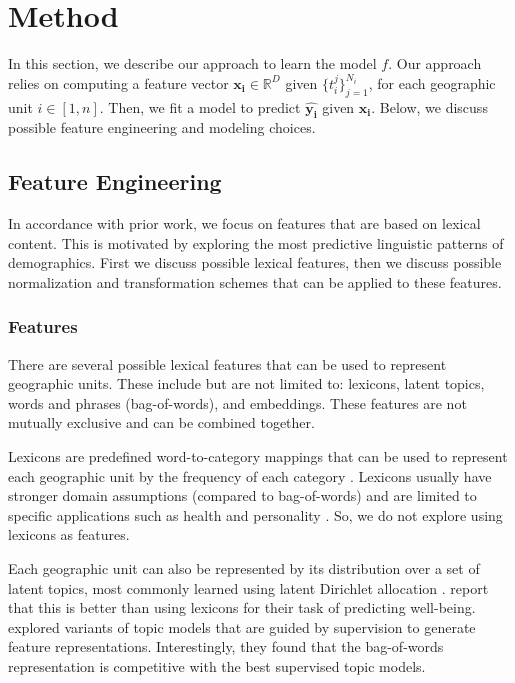 \documentclass[letterpaper]{article}
\begin{document}
\section{Method}

\noindent In this section, we describe our approach to learn the model $f$. Our approach relies on computing a feature vector $\mathbf{x_i} \in \mathbb{R}^D$ given $\{t_i^j\}_{j=1}^{N_i}$, for each geographic unit $i \in [1, n]$. Then, we fit a model to predict $\widehat{\mathbf{y_i}}$ given $\mathbf{x_i}$. Below, we discuss possible feature engineering and modeling choices.

\subsection{Feature Engineering}
In accordance with prior work, we focus on features that are based on lexical content. This is motivated by exploring the most predictive linguistic patterns of demographics. First we discuss possible lexical features, then we discuss possible normalization and transformation schemes that can be applied to these features.

\subsubsection{Features} There are several possible lexical features that can be used to represent geographic units. These include but are not limited to: lexicons, latent topics, words and phrases (bag-of-words), and embeddings. These features are not mutually exclusive and can be combined together.

Lexicons are predefined word-to-category mappings that can be used to represent each geographic unit by the frequency of each category \cite{schwartz2013characterizing,culotta2014estimating}. Lexicons usually have stronger domain assumptions (compared to bag-of-words) \cite{o2011computational} and are limited to specific applications such as health and personality \cite{culotta2014estimating}. So, we do not explore using lexicons as features.

Each geographic unit can also be represented by its distribution over a set of latent topics, most commonly learned using latent Dirichlet allocation \cite{blei2003latent}. \citeauthor{schwartz2013characterizing}  report that this is better than using lexicons for their task of predicting well-being. \citeauthor{benton2016collective}  explored variants of topic models that are guided by supervision to generate feature representations. Interestingly, they found that the bag-of-words representation is competitive with the best supervised topic models.
\end{document}
